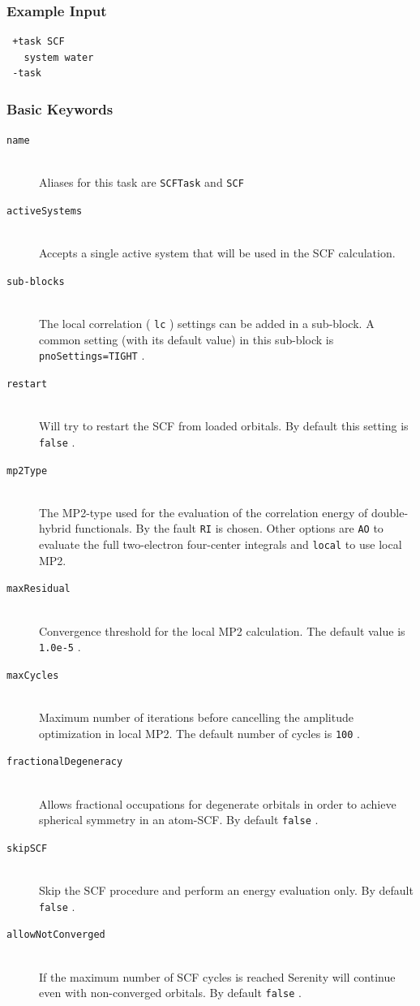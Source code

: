 \documentclass[bibliography=totocnumbered,a4paper,10pt,oneside]{scrbook}
\newcommand{\ttt}[1]{%
  \begingroup\setlength{\fboxsep}{1pt}%
  \colorbox{serenity-green!30}{\texttt{\hspace*{2pt}\vphantom{(g}#1\hspace*{2pt}}}%
  \endgroup
}
\begin{document}
\subsubsection{Example Input}
\begin{lstlisting}
 +task SCF
   system water
 -task
\end{lstlisting}
\subsubsection{Basic Keywords}
\begin{description}
	\item[\texttt{name}]\hfill \\
	Aliases for this task are \ttt{SCFTask} and \ttt{SCF}
	\item[\texttt{activeSystems}]\hfill \\
	Accepts a single active system that will be used in the SCF calculation.
	\item[\texttt{sub-blocks}]\hfill \\
	The local correlation (\ttt{lc}) settings can be added in a sub-block. A common setting (with its default value) in this sub-block is \ttt{pnoSettings=TIGHT}.	
	\item[\texttt{restart}]\hfill \\
	Will try to restart the SCF from loaded orbitals. By default this setting is \ttt{false}.
	\item[\texttt{mp2Type}]\hfill \\
	The MP2-type used for the evaluation of the correlation energy of double-hybrid functionals. By the fault \ttt{RI} is chosen. Other options are \ttt{AO} to evaluate the full two-electron four-center integrals and \ttt{local} to use local MP2.
	\item[\texttt{maxResidual}]\hfill \\
	Convergence threshold for the local MP2 calculation. The default value is \ttt{1.0e-5}.
	\item[\texttt{maxCycles}]\hfill \\
	Maximum number of iterations before cancelling the amplitude optimization in local MP2. The default number of cycles is \ttt{100}.
	\item[\texttt{fractionalDegeneracy}]\hfill \\
	Allows fractional occupations for degenerate orbitals in order to achieve spherical symmetry in an atom-SCF. By default \ttt{false}.
	\item[\texttt{skipSCF}]\hfill \\
	Skip the SCF procedure and perform an energy evaluation only. By default \ttt{false}.
	\item[\texttt{allowNotConverged}]\hfill \\
    If the maximum number of SCF cycles is reached Serenity will continue even with non-converged orbitals. By default \ttt{false}.
\end{description}
\end{document}
